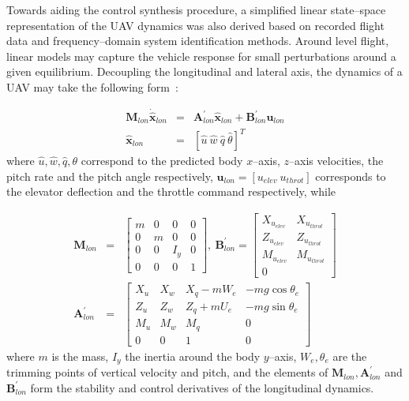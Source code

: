 
Towards aiding the control synthesis procedure, a simplified linear state--space representation of the UAV dynamics was also derived based on recorded flight data and frequency--domain system identification methods. Around level flight, linear models may capture the vehicle response for small perturbations around a given equilibrium. Decoupling the longitudinal and lateral axis, the dynamics of a UAV may take the following form~\cite{dorobantu2011frequency,OMLAS_MED_14}: 

\small
\begin{eqnarray}\label{LON_DYN}
 \mathbf{M}_{lon}\dot{\mathbf{\hat{x}}}_{lon} &=& \mathbf{A}^\prime_{lon}\mathbf{\hat{x}}_{lon}+\mathbf{B}^\prime_{lon}\mathbf{u}_{lon} \\ \nonumber
 \mathbf{\hat{x}}_{lon} &=& \left[ \hat{u}~\hat{w}~\hat{q}~\hat{\theta} \right]^T
\end{eqnarray}
\normalsize
where $\hat{u},\hat{w},\hat{q},\theta$ correspond to the predicted body $x$--axis, $z$--axis velocities, the pitch rate and the pitch angle respectively, $\mathbf{u}_{lon} = [u_{elev}~u_{throt}]$ corresponds to the elevator deflection and the throttle command respectively, while

\footnotesize
\begin{eqnarray}
\mathbf{M}_{lon} &=& \begin{bmatrix}

m & 0 & 0 & 0\\ 
0 & m & 0 & 0\\ 
0 & 0 & I_y & 0\\ 
0 & 0 & 0 & 1
\end{bmatrix},~
\mathbf{B}^\prime_{lon} = \begin{bmatrix}
X_{u_{elev}} & X_{u_{throt}}\\ 
Z_{u_{elev}} & Z_{u_{throt}}\\ 
M_{u_{elev}} & M_{u_{throt}}\\ 
0
\end{bmatrix} \\ \nonumber
\mathbf{A}^\prime_{lon} &=& \begin{bmatrix}
X_u & X_w & X_q-mW_e & -mg\cos\theta_e\\ 
Z_u & Z_w & Z_q+mU_e & -mg\sin\theta_e\\ 
M_u & M_w & M_q & 0 \\ 
0 & 0 & 1 & 0
\end{bmatrix}
\end{eqnarray}
\normalsize
where $m$ is the mass, $I_y$ the inertia around the body $y$--axis, $W_e,\theta_e$ are the trimming points of vertical velocity and pitch, and the elements of $\mathbf{M}_{lon},\mathbf{A}^\prime_{lon}$ and $\mathbf{B}^\prime_{lon}$ form the stability and control derivatives of the longitudinal dynamics. 

